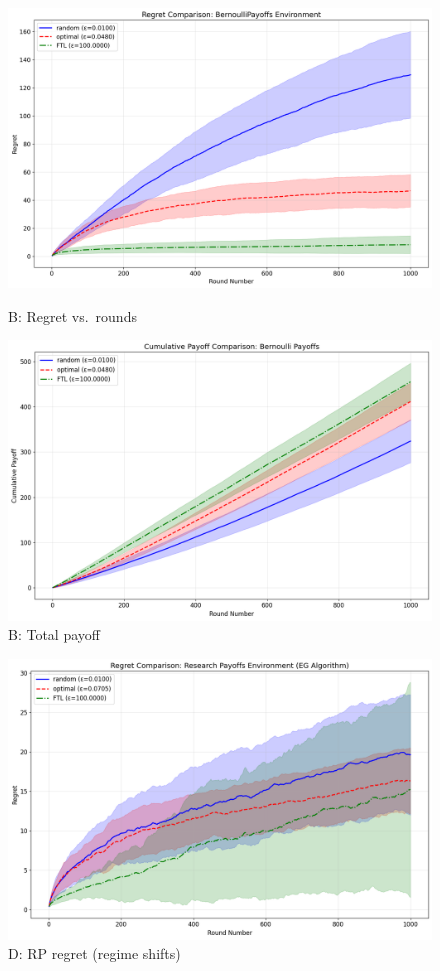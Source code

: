 \documentclass[10pt]{article}
\begin{document}
\begin{figure}[h!]
\centering
\begin{minipage}[t]{0.48\textwidth}
    \centering
    \includegraphics[width=\linewidth]{bernoulli_regret_comparison.png}
    \caption*{\footnotesize B: Regret vs.\ rounds}
\end{minipage}\hfill
\begin{minipage}[t]{0.48\textwidth}
    \centering
    \includegraphics[width=\linewidth]{BP_payoff.png}
    \caption*{\footnotesize B: Total payoff}
\end{minipage}
\end{figure}

\begin{figure}[h!]
\centering
\begin{minipage}[t]{0.48\textwidth}
    \centering
    \includegraphics[width=\linewidth]{RP_regret.png}
    \caption*{\footnotesize D: RP regret (regime shifts)}
\end{minipage}
\end{figure}
\end{document}
